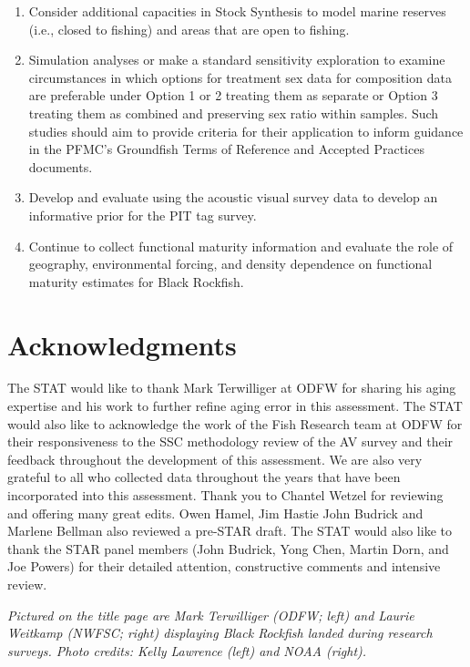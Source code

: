 \documentclass[11pt,
  letterpaper,
]{article}
\begin{document}
\begin{enumerate}
\item
  Consider additional capacities in Stock Synthesis to model marine reserves (i.e., closed to fishing) and areas that are open to fishing.
\item
  Simulation analyses or make a standard sensitivity exploration to examine circumstances in which options for treatment sex data for composition data are preferable under Option 1 or 2 treating them as separate or Option 3 treating them as combined and preserving sex ratio within samples. Such studies should aim to provide criteria for their application to inform guidance in the PFMC's Groundfish Terms of Reference and Accepted Practices documents.
\item
  Develop and evaluate using the acoustic visual survey data to develop an informative prior for the PIT tag survey.
\item
  Continue to collect functional maturity information and evaluate the role of geography, environmental forcing, and density dependence on functional maturity estimates for Black Rockfish.
\end{enumerate}

\hypertarget{acknowledgments}{%
\section{Acknowledgments}\label{acknowledgments}}

The STAT would like to thank Mark Terwilliger at ODFW for sharing his aging expertise and his work to further refine aging error in this assessment. The STAT would also like to acknowledge the work of the Fish Research team at ODFW for their responsiveness to the SSC methodology review of the AV survey and their feedback throughout the development of this assessment. We are also very grateful to all who collected data throughout the years that have been incorporated into this assessment. Thank you to Chantel Wetzel for reviewing and offering many great edits. Owen Hamel, Jim Hastie John Budrick and Marlene Bellman also reviewed a pre-STAR draft. The STAT would also like to thank the STAR panel members (John Budrick, Yong Chen, Martin Dorn, and Joe Powers) for their detailed attention, constructive comments and intensive review.

\textit{Pictured on the title page are Mark Terwilliger (ODFW; left) and Laurie Weitkamp (NWFSC; right) displaying Black Rockfish landed during research surveys. Photo credits: Kelly Lawrence (left) and NOAA (right).}
\end{document}

